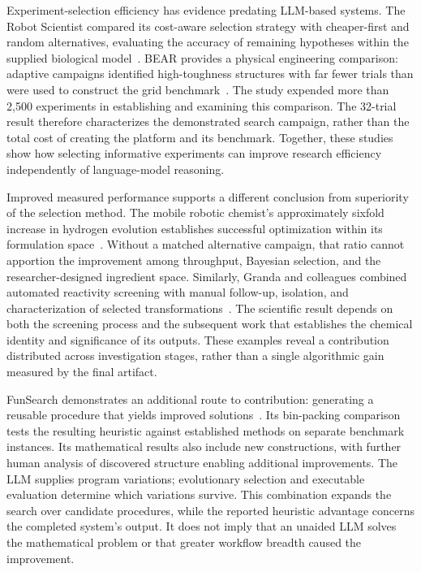 Experiment-selection efficiency has evidence predating LLM-based systems. The Robot Scientist compared its cost-aware selection strategy with cheaper-first and random alternatives, evaluating the accuracy of remaining hypotheses within the supplied biological model~\cite{king2004}. BEAR provides a physical engineering comparison: adaptive campaigns identified high-toughness structures with far fewer trials than were used to construct the grid benchmark~\cite{asd0504}. The study expended more than 2,500 experiments in establishing and examining this comparison. The 32-trial result therefore characterizes the demonstrated search campaign, rather than the total cost of creating the platform and its benchmark. Together, these studies show how selecting informative experiments can improve research efficiency independently of language-model reasoning.

Improved measured performance supports a different conclusion from superiority of the selection method. The mobile robotic chemist's approximately sixfold increase in hydrogen evolution establishes successful optimization within its formulation space~\cite{burger2020}. Without a matched alternative campaign, that ratio cannot apportion the improvement among throughput, Bayesian selection, and the researcher-designed ingredient space. Similarly, Granda and colleagues combined automated reactivity screening with manual follow-up, isolation, and characterization of selected transformations~\cite{asd0734}. The scientific result depends on both the screening process and the subsequent work that establishes the chemical identity and significance of its outputs. These examples reveal a contribution distributed across investigation stages, rather than a single algorithmic gain measured by the final artifact.

FunSearch demonstrates an additional route to contribution: generating a reusable procedure that yields improved solutions~\cite{asd0512}. Its bin-packing comparison tests the resulting heuristic against established methods on separate benchmark instances. Its mathematical results also include new constructions, with further human analysis of discovered structure enabling additional improvements. The LLM supplies program variations; evolutionary selection and executable evaluation determine which variations survive. This combination expands the search over candidate procedures, while the reported heuristic advantage concerns the completed system's output. It does not imply that an unaided LLM solves the mathematical problem or that greater workflow breadth caused the improvement.

